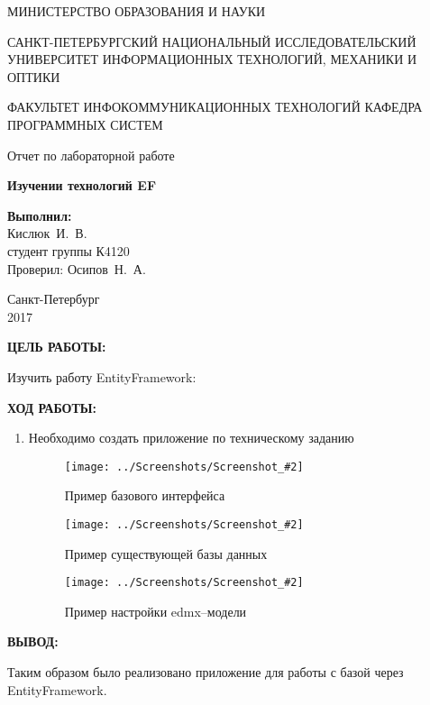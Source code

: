 \documentclass[14pt,a4paper]{extreport}
\newcommand{\screenshot}[2]{\begin{figure}[ht]%
\centering\texttt{[image: ../Screenshots/Screenshot\_\#2]}%
\caption{#1}%
\label{picture#2}%
\end{figure}%
}
\newcommand{\header}[1]{%
{
\fontsize{16pt}{14pt}\selectfont
\begin{center}
\textbf{\MakeUppercase{#1}:}
\end{center}
}
}
\newcommand{\osipov}{Осипов~Н.~А.}
\newcommand{\igork}{Кислюк~И.~В.}
\begin{document}
	\begin{titlepage}
	\begin{center}	
		\fontsize{14pt}{14pt}\selectfont
		МИНИСТЕРСТВО ОБРАЗОВАНИЯ И НАУКИ\\

		\vspace*{0.6\baselineskip}
		
		САНКТ-ПЕТЕРБУРГСКИЙ НАЦИОНАЛЬНЫЙ ИССЛЕДОВАТЕЛЬСКИЙ УНИВЕРСИТЕТ ИНФОРМАЦИОННЫХ ТЕХНОЛОГИЙ, МЕХАНИКИ И ОПТИКИ
		
		\vspace*{0.6\baselineskip}
		ФАКУЛЬТЕТ ИНФОКОММУНИКАЦИОННЫХ ТЕХНОЛОГИЙ
		КАФЕДРА ПРОГРАММНЫХ СИСТЕМ
	
		\vspace*{7\baselineskip}
		\fontsize{19pt}{18pt}\selectfont
		Отчет по лабораторной работе
		
		\fontsize{20pt}{18pt}\selectfont
		\textbf{Изучении технологий EF}\\
		\vspace*{1.15\baselineskip}
		\end{center}
	
	\vspace*{2\baselineskip}
	\begin{flushright}
	\fontsize{14pt}{14pt}\selectfont
	\textbf{Выполнил:}\\
	\igork\\
	студент группы К4120\\
	Проверил: \osipov\\
	\end{flushright}
	
	\vspace{\fill}
	\begin{center}
	Санкт-Петербург\\
	2017
	\end{center}
	
\end{titlepage}

\newpage

\header{Цель работы}

\fontsize{14pt}{14pt}\selectfont

\begin{center}
Изучить работу EntityFramework:
\end{center}

\clearpage

\header{Ход работы}

\begin{enumerate}

\item Необходимо создать приложение по техническому заданию


\screenshot{Пример базового интерфейса}{8}
\screenshot{Пример существующей базы данных}{24}
\screenshot{Пример настройки edmx--модели}{29}

\end{enumerate}

\clearpage

\header{Вывод}

Таким образом было реализовано приложение для работы с базой через EntityFramework.
\end{document}
